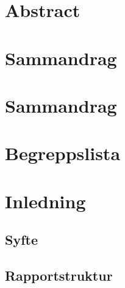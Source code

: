 \documentclass[12pt,a4paper,twoside,openright]{report}
\begin{document}


\newpage\null{} %
\newpage


\newpage
{} %
\setcounter{page}{3}

\chapter*{Abstract}

\newpage

\chapter*{Sammandrag}

\newpage

\chapter*{Sammandrag}

\newpage

\tableofcontents
\newpage

\chapter*{Begreppslista}


\newpage


\chapter{Inledning}\label{chap:inledning}

% 
% 
\section{Syfte}\label{sec:syfte}

\section{Rapportstruktur}

\end{document}
